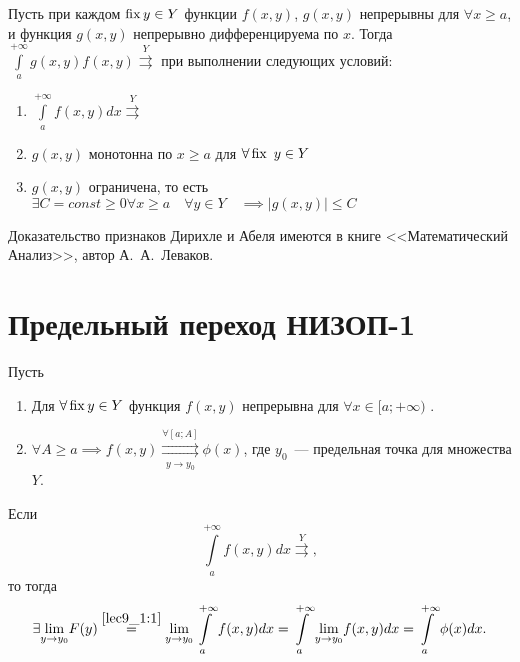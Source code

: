\documentclass[../../main.tex]{subfiles}
\begin{document}
\begin{thm}

Пусть при каждом $\operatorname{fix} y \in Y$ функции $f(x,y)$, $g(x,y)$ непрерывны 
для $\forall x \ge a$, и функция $g(x, y)$ непрерывно дифференцируема по $x$.
Тогда $\int\limits_a^{+\infty} g(x,y) f(x,y) \overset{Y}{\rightrightarrows}$
при выполнении следующих условий:
\begin{enumerate}
	\item $\int\limits_a^{+\infty}f(x,y)dx \overset{Y}{\rightrightarrows}$
	\item $g(x, y)$ монотонна по $x \ge a$ для $\forall \operatorname{fix} \ y \in Y$
	\item $g(x,y)$ ограничена, то есть $\exists C = const \ge 0\forall x 
	\ge a \quad \forall y \in Y \quad \implies \left|g(x,y)\right| \le C $
\end{enumerate}
\end{thm}

Доказательство признаков Дирихле и Абеля имеются в книге <<Математический 
Анализ>>, автор А.~А.~Леваков.


\section{ Предельный переход НИЗОП-1}
\begin{thm}
Пусть

\begin{enumerate}
\item Для $\forall \operatorname{fix}  y \in Y$ функция $f(x,y)$ непрерывна для $\forall x 
\in 
[a;+\infty)$ 
.
\item $\forall A \ge a \implies f(x,y) \overset{\forall [a;A]}{\underset{y \to 
y_0}{\rightrightarrows}} \phi(x) $, где $y_0$~--- 
предельная точка для множества $Y$.
\end{enumerate}

Если \[\int\limits_a^{+\infty}f(x,y)dx \overset{Y}\rightrightarrows, \] то 
тогда 
\begin{equation}\label{lec10:12}
\exists \underset{y \to y_0}\lim F(y) \stk{lec9_1:1}= \underset{y \to 
y_0}\lim\int\limits_a^{+\infty}f(x,y)dx =\int\limits_a^{+\infty} \underset{y 
\to y_0}\lim f(x,y)dx = \int\limits_a^{+\infty}\phi(x)dx. \end{equation}
\end{thm}
\end{document}
